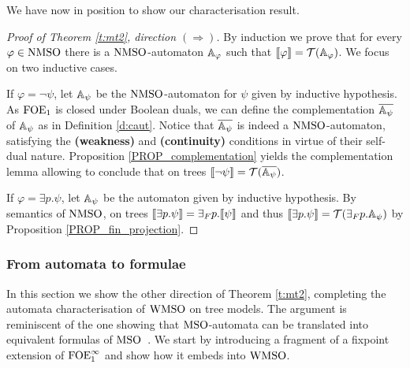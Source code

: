 We have now in position to show our characterisation result.

\begin{proof}[Proof of Theorem \ref{t:mt2}, direction $(\Rightarrow)$]
By induction we prove that for every $\varphi \in \mathrm{NMSO}$ there is a $\mathrm{NMSO}$-automaton $\mathbb{A}_\varphi$ such that $\llbracket\varphi\rrbracket = \mathcal{T}(\mathbb{A}_\varphi)$. We focus on two %
inductive cases.

  \indent If $\varphi = \neg \psi$, let $\mathbb{A}_{\psi}$ be the $\mathrm{NMSO}$-automaton for $\psi$ given by inductive hypothesis. As $\mathrm{FOE}_1$ is closed under Boolean duals, we can define the complementation $\overline{\mathbb{A}_{\psi}}$ of $\mathbb{A}_{\psi}$ as in Definition \ref{d:caut}. Notice that $\overline{\mathbb{A}_{\psi}}$ is indeed a $\mathrm{NMSO}$-automaton, satisfying the \textbf{(weakness)} and \textbf{(continuity)} conditions in virtue of their self-dual nature. Proposition \ref{PROP_complementation} yields the complementation lemma allowing to conclude that on trees $\llbracket\neg \psi\rrbracket = \mathcal{T}(\overline{\mathbb{A}_{\psi}})$.

\indent   If $\varphi = \exists p.\psi$, let $\mathbb{A}_{\psi}$ be the automaton given by inductive hypothesis. By semantics of $\mathrm{NMSO}$, on trees $\llbracket\exists p. \psi\rrbracket = {{\exists}_F p}.\llbracket\psi\rrbracket$ and thus $\llbracket\exists p.\psi\rrbracket = \mathcal{T}({{\exists}_F p}.\mathbb{A}_{\psi})$ by Proposition \ref{PROP_fin_projection}.
\end{proof} 



\subsubsection{From automata to formulae}


In this section we show the other direction of Theorem \ref{t:mt2}, completing
the automata characterisation of $\mathrm{WMSO}$ on tree models.
The argument is reminiscent of the one showing that $\mathrm{MSO}$-automata can be
translated into equivalent formulas of $\mathrm{MSO}$~\cite{Walukiewicz96}.
We start by introducing a fragment of a fixpoint extension
of $\mathrm{FOE}^{\infty}_1$ and show how it embeds into $\mathrm{WMSO}$.

